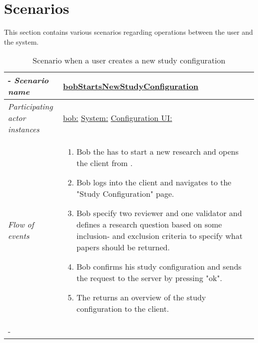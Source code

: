 \section{Scenarios}
This section contains various scenarios regarding operations between the user and the system.

%
%
\begin{table}[h!]
\tabulinesep=1.5mm
\begin{tabu} to 
	\tabucline[1.5pt]-
	\textit{Scenario name} & \underline{bobStartsNewStudyConfiguration} \\
	\hline
	\textit{Participating actor \newline instances} & \underline{bob:\researcher} \newline \underline{System:\system}
	\newline \underline{Configuration UI:\configUI} \\
	\hline
	\textit{Flow of events} &
	\vspace{-3mm}
	\begin{enumerate}[leftmargin=*,topsep=0pt,itemsep=-1ex]
		\item Bob the \researcher has to start a new research  and opens the client from \configUI. 
		\item Bob logs into the client and navigates to the "Study Configuration" page. 
		\item Bob specify two reviewer and one validator and defines a research question based on some inclusion- and exclusion criteria to specify what papers should be returned. 
		\item Bob confirms his study configuration and sends the request to the server by pressing "ok".
		\item The \system returns an overview of the study configuration to the client.
	\end{enumerate} \\
	\tabucline[1.5pt]-
\end{tabu}
\caption{Scenario when a user creates a new study configuration}
\label{sc:bobStartsNewStudyConfiguration}
\end{table}


